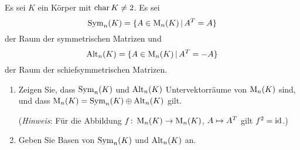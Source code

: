 \documentclass[a4paper, 10pt]{scrartcl}
\begin{document}
\begin{question}[subtitle = Symmetrische und schiefsymmetrische Matrizen]
  Es sei $K$ ein Körper mit $\operatorname{char} K \neq 2$.
  Es sei
  \[
      \operatorname{Sym}_{n}(K)
    = \{ A \in \operatorname{M}_{n}(K) \,|\, A^T = A \}
  \]
  der Raum der symmetrischen Matrizen und
  \[
      \operatorname{Alt}_{n}(K)
    = \{ A \in \operatorname{M}_{n}(K) \,|\, A^T = -A\}
  \]
  der Raum der schiefsymmetrischen Matrizen.
  \begin{enumerate}
    \item
      Zeigen Sie, dass $\operatorname{Sym}_{n}(K)$ und $\operatorname{Alt}_{n}(K)$ Untervektorräume von $\operatorname{M}_{n}(K)$ sind, und dass $\operatorname{M}_{n}(K) = \operatorname{Sym}_{n}(K) \oplus \operatorname{Alt}_{n}(K)$ gilt.
      
      (\emph{Hinweis}:
       Für die Abbildung $f \colon \operatorname{M}_{n}(K) \to \operatorname{M}_{n}(K)$, $A \mapsto A^T$ gilt $f^2 = \operatorname{id}$.)
    \item
      Geben Sie Basen von $\operatorname{Sym}_{n}(K)$ und $\operatorname{Alt}_{n}(K)$ an.
  \end{enumerate}
\end{question}











\end{document}
